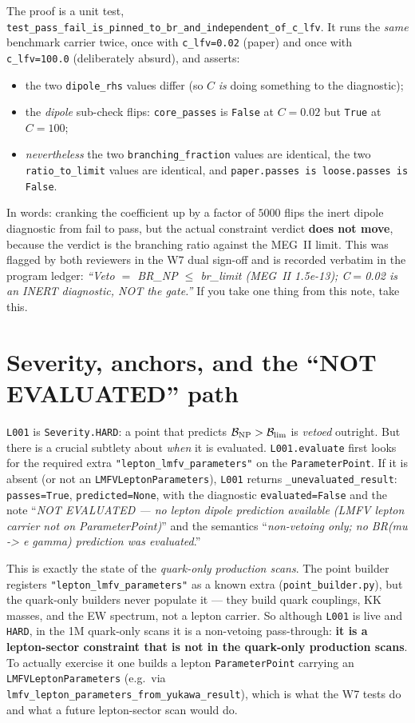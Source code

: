 \documentclass[11pt]{article}
\newcommand{\BR}{\mathcal{B}}
\newcommand{\code}[1]{\texttt{#1}}
\theoremstyle{definition}
\begin{document}
The proof is a unit test,
\code{test\_pass\_fail\_is\_pinned\_to\_br\_and\_independent\_of\_c\_lfv}. It runs
the \emph{same} benchmark carrier twice, once with \code{c\_lfv=0.02} (paper) and
once with \code{c\_lfv=100.0} (deliberately absurd), and asserts:
\begin{itemize}[leftmargin=1.4em,nosep]
\item the two \code{dipole\_rhs} values differ (so $C$ \emph{is} doing something
to the diagnostic);
\item the \emph{dipole} sub-check flips: \code{core\_passes} is \code{False} at
$C=0.02$ but \code{True} at $C=100$;
\item \emph{nevertheless} the two \code{branching\_fraction} values are
identical, the two \code{ratio\_to\_limit} values are identical, and
\code{paper.passes is loose.passes is False}.
\end{itemize}
In words: cranking the coefficient up by a factor of $5000$ flips the inert
dipole diagnostic from fail to pass, but the actual constraint verdict
\textbf{does not move}, because the verdict is the branching ratio against the
MEG~II limit. This was flagged by both reviewers in the W7 dual sign-off and is
recorded verbatim in the program ledger: \emph{``Veto $=$ BR\_NP $\le$ br\_limit
(MEG~II 1.5e-13); C$=$0.02 is an INERT diagnostic, NOT the gate.''} If you take
one thing from this note, take this.

\section{Severity, anchors, and the ``NOT EVALUATED'' path}
\label{sec:notinscan}

\code{L001} is \code{Severity.HARD}: a point that predicts $\BR_{\rm NP}>\BR_{\rm lim}$
is \emph{vetoed} outright. But there is a crucial subtlety about \emph{when} it is
evaluated. \code{L001.evaluate} first looks for the required extra
\code{"lepton\_lmfv\_parameters"} on the \code{ParameterPoint}. If it is absent
(or not an \code{LMFVLeptonParameters}), \code{L001} returns
\code{\_unevaluated\_result}: \code{passes=True}, \code{predicted=None}, with the
diagnostic \code{evaluated=False} and the note
``\emph{NOT EVALUATED --- no lepton dipole prediction available (LMFV lepton
carrier not on ParameterPoint)}'' and the semantics
``\emph{non-vetoing only; no BR(mu -> e gamma) prediction was evaluated}.''

This is exactly the state of the \emph{quark-only production scans}. The point
builder registers \code{"lepton\_lmfv\_parameters"} as a known extra
(\code{point\_builder.py}), but the quark-only builders never populate it ---
they build quark couplings, KK masses, and the EW spectrum, not a lepton carrier.
So although \code{L001} is live and \code{HARD}, in the 1M quark-only scans it is
a non-vetoing pass-through: \textbf{it is a lepton-sector constraint that is not
in the quark-only production scans}. To actually exercise it one builds a lepton
\code{ParameterPoint} carrying an \code{LMFVLeptonParameters} (e.g.\ via
\code{lmfv\_lepton\_parameters\_from\_yukawa\_result}), which is what the W7 tests
do and what a future lepton-sector scan would do.
\end{document}
